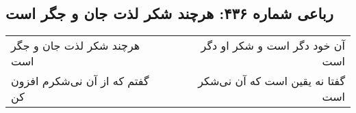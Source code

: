 \begin{center}
\section*{رباعی شماره ۴۳۶: هرچند شکر لذت جان و جگر است}
\label{sec:0436}
\begin{longtable}{l p{0.5cm} r}
هرچند شکر لذت جان و جگر است
&&
آن خود دگر است و شکر او دگر است
\\
گفتم که از آن نی‌شکرم افزون کن
&&
گفتا نه یقین است که آن نی‌شکر است
\\
\end{longtable}
\end{center}
